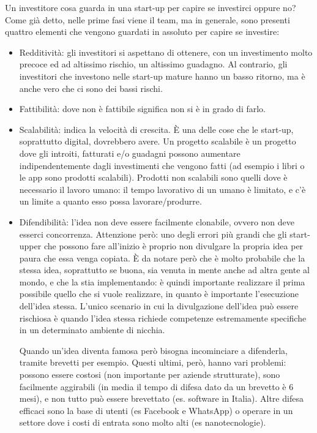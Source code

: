 Un investitore cosa guarda in una start-up per capire se investirci oppure no?
Come già detto, nelle prime fasi viene il team, ma in generale, sono presenti
quattro elementi che vengono guardati in assoluto per capire se investire:
\begin{itemize}
 \item Redditività: gli investitori si aspettano di ottenere, con un
investimento molto precoce ed ad altissimo rischio, un altissimo guadagno. Al
contrario, gli investitori che investono nelle start-up mature hanno un basso
ritorno, ma è anche vero che ci sono dei bassi rischi.
 \item Fattibilità: dove non è fattibile significa non si è in grado di farlo.
 \item Scalabilità: indica la velocità di crescita. È una delle cose che le
start-up, soprattutto digital, dovrebbero avere. Un progetto scalabile è un
progetto dove gli introiti, fatturati e/o guadagni possono aumentare
indipendentemente dagli investimenti che vengono fatti (ad esempio i libri o le
app sono prodotti scalabili). Prodotti non scalabili sono quelli dove è
necessario il lavoro umano: il tempo lavorativo di un umano è limitato, e c'è
un limite a quanto esso possa lavorare/produrre.
 \item Difendibilità: l'idea non deve essere facilmente clonabile, ovvero non
deve esserci concorrenza. Attenzione però: uno degli errori più grandi che gli
start-upper che possono fare all'inizio è proprio non divulgare la propria idea
per paura che essa venga copiata. È da notare però che è molto probabile che
la stessa idea, soprattutto se buona, sia venuta in mente anche ad altra gente
al mondo, e che la stia implementando: è quindi importante realizzare il prima
possibile quello che si vuole realizzare, in quanto è importante l'esecuzione
dell'idea stessa. L'unico scenario in cui la divulgazione dell'idea può essere
rischiosa è quando l'idea stessa richiede competenze estremamente specifiche in
un determinato ambiente di nicchia.

Quando un'idea diventa famosa però bisogna incominciare a
difenderla, tramite brevetti per esempio. Questi ultimi, però, hanno vari 
problemi: possono essere costosi (non importante per aziende strutturate),
sono facilmente aggirabili (in media il tempo di difesa dato da un brevetto
è 6 mesi), e non tutto può essere brevettato (es. software in Italia). Altre
difesa efficaci sono la base di utenti (es Facebook e WhatsApp) o operare in
un settore dove i costi di entrata sono molto alti (es nanotecnologie).
\end{itemize}
